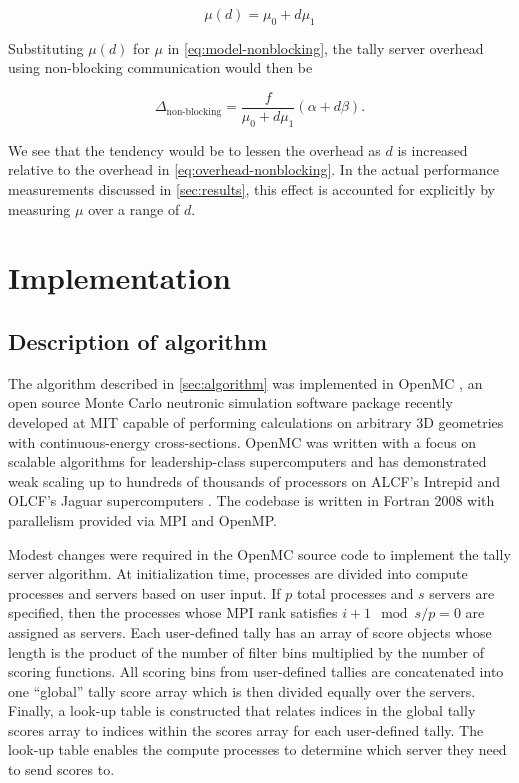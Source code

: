 \documentclass[3p]{elsarticle}
\begin{document}
\begin{equation}
  \label{eq:mu-function}
  \mu(d) = \mu_0 + d\mu_1
\end{equation}

\noindent Substituting $\mu(d)$ for $\mu$ in \eqref{eq:model-nonblocking}, the
tally server overhead using non-blocking communication would then be

\begin{equation}
  \label{eq:model-blocking-mud}
  \Delta_{\text{non-blocking}} = \frac{f}{\mu_0 + d\mu_1} \left ( \alpha + d\beta
    \right ).
\end{equation}

\noindent We see that the tendency would be to lessen the overhead as $d$ is
increased relative to the overhead in \eqref{eq:overhead-nonblocking}. In the
actual performance measurements discussed in \autoref{sec:results}, this effect
is accounted for explicitly by measuring $\mu$ over a range of $d$.

\section{Implementation}
\label{sec:implementation}

\subsection{Description of algorithm}

The algorithm described in \autoref{sec:algorithm} was implemented in OpenMC
\cite{ane-romano-2012}, an open source Monte Carlo neutronic simulation software
package recently developed at MIT capable of performing calculations on
arbitrary 3D geometries with continuous-energy cross-sections. OpenMC was
written with a focus on scalable algorithms for leadership-class supercomputers
and has demonstrated weak scaling up to hundreds of thousands of processors on
ALCF's Intrepid and OLCF's Jaguar supercomputers \cite{ane-romano-2012}. The
codebase is written in Fortran 2008 with parallelism provided via MPI and
OpenMP.

Modest changes were required in the OpenMC source code to implement the tally
server algorithm. At initialization time, processes are divided into compute
processes and servers based on user input. If $p$ total processes and $s$
servers are specified, then the processes whose MPI rank satisfies $i + 1 \mod
s/p = 0$ are assigned as servers. Each user-defined tally has an array of score
objects whose length is the product of the number of filter bins multiplied by
the number of scoring functions. All scoring bins from user-defined tallies are
concatenated into one ``global'' tally score array which is then divided equally
over the servers. Finally, a look-up table is constructed that relates indices
in the global tally scores array to indices within the scores array for each
user-defined tally. The look-up table enables the compute processes to determine
which server they need to send scores to.
\end{document}

